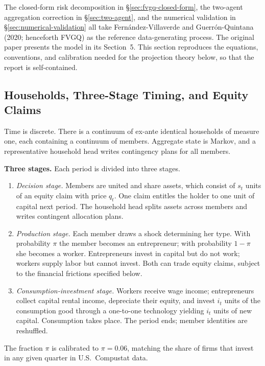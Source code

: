 \documentclass[11pt]{article}
\theoremstyle{plain}
\theoremstyle{definition}
\begin{document}
The closed-form risk decomposition in §\ref{sec:fvgq-closed-form}, the two-agent
aggregation correction in §\ref{sec:two-agent}, and the numerical validation in
§\ref{sec:numerical-validation} all take Fern\'andez-Villaverde and
Guerr\'on-Quintana (2020; henceforth FVGQ) as the reference
data-generating process. The original paper presents the model in its Section~5.
This section reproduces the equations, conventions, and calibration needed for
the projection theory below, so that the report is self-contained.

\subsection{Households, Three-Stage Timing, and Equity Claims}

Time is discrete. There is a continuum of ex-ante identical households of
measure one, each containing a continuum of members. Aggregate state is
Markov, and a representative household head writes contingency plans for all
members.

\medskip

\noindent\textbf{Three stages.} Each period is divided into three stages.
\begin{enumerate}
  \item \textit{Decision stage.} Members are united and share assets, which
  consist of $s_t$ units of an equity claim with price $q_t$. One claim
  entitles the holder to one unit of capital next period. The household head
  splits assets across members and writes contingent allocation plans.

  \item \textit{Production stage.} Each member draws a shock determining her
  type. With probability $\pi$ the member becomes an entrepreneur; with
  probability $1-\pi$ she becomes a worker. Entrepreneurs invest in capital
  but do not work; workers supply labor but cannot invest. Both can trade
  equity claims, subject to the financial frictions specified below.

  \item \textit{Consumption-investment stage.} Workers receive wage income;
  entrepreneurs collect capital rental income, depreciate their equity, and
  invest $i_t$ units of the consumption good through a one-to-one technology
  yielding $i_t$ units of new capital. Consumption takes place. The period
  ends; member identities are reshuffled.
\end{enumerate}

The fraction $\pi$ is calibrated to $\pi=0.06$, matching the share of firms
that invest in any given quarter in U.S.\ Compustat data.
\end{document}
